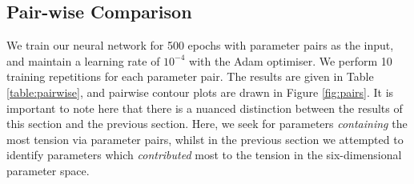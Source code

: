 \documentclass[%
 reprint,
 amsmath,amssymb,
 aps,
]{revtex4-2}
\begin{document}



\subsection{Pair-wise Comparison} \label{section:pair}

We train our neural network for 500 epochs with parameter pairs as the input, and maintain a learning rate of $10^{-4}$ with the Adam optimiser. We perform 10 training repetitions for each parameter pair. The results are given in Table \ref{table:pairwise}, and pairwise contour plots are drawn in Figure \ref{fig:pairs}. It is important to note here that there is a nuanced distinction between the results of this section and the previous section. Here, we seek for parameters \textit{containing} the most tension via parameter pairs, whilst in the previous section we attempted to identify parameters which \textit{contributed} most to the tension in the six-dimensional parameter space.
\end{document}

